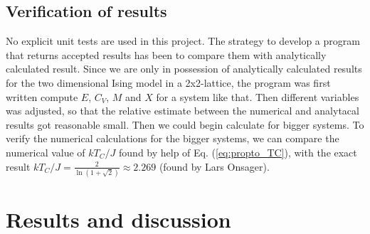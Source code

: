 \documentclass[12pt]{article}
\begin{document}
\begin{flushleft}
\subsection{Verification of results}
No explicit unit tests are used in this project. The strategy to develop a program that returns accepted results has been to compare them with analytically calculated result. Since we are only in possession of analytically calculated results for the two dimensional Ising model in a 2x2-lattice, the program was first written compute $E$, $C_V$, $M$ and $X$ for a system like that. Then different variables was adjusted, so that the relative estimate between the numerical and analytacal results got reasonable small. Then we could begin calculate for bigger systems. To verify the numerical calculations for the bigger systems, we can compare the numerical value of $kT_C/J$ found by help of Eq. (\ref{eq:propto_TC}), with the exact result $kT_C/J = \frac{2}{\ln(1+\sqrt{2})} \approx 2.269$ (found by Lars Onsager).

\newpage
\section{Results and discussion}

\end{flushleft}
\end{document}
